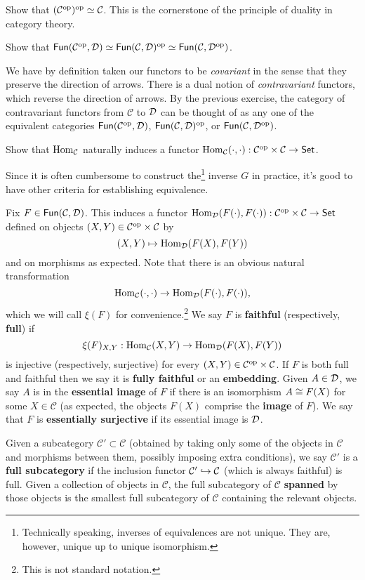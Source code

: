 \documentclass[11pt]{article}
\renewcommand{\C}{\mathcal{C}}
\begin{document}
\begin{exercise}
Show that $(\C^{\op})^{\op}\simeq\C$. This is the cornerstone of the principle of duality in category theory.
\end{exercise}

\begin{exercise}
Show that $\Fun(\C^{\op},\D)\simeq\Fun(\C,\D)^{\op}\simeq\Fun(\C,\D^{\op})$.
\end{exercise}

\begin{remark}
We have by definition taken our functors to be \emph{covariant} in the sense that they preserve the direction of arrows. There is a dual notion of \emph{contravariant} functors, which reverse the direction of arrows. By the previous exercise, the category of contravariant functors from $\C$ to $\mathcal{D}$ can be thought of as any one of the equivalent categories $\Fun(\C^{\op},\D)$, $\Fun(\C,\D)^{\op}$, or $\Fun(\C,\D^{\op})$.
\end{remark} 

\begin{exercise}
Show that $\Hom_{\C}$ naturally induces a functor $\Hom_{\C}(\cdot,\cdot): \C^{\op}\times\C\to\Set$.
\end{exercise}

Since it is often cumbersome to construct the\footnote{Technically speaking, inverses of equivalences are not unique. They are, however, unique up to unique isomorphism.} inverse $G$ in practice, it's good to have other criteria for establishing equivalence.

\begin{definition}
Fix $F\in\Fun(\C,\D)$. This induces a functor $\Hom_{\D}(F(\cdot),F(\cdot)): \C^{\op}\times\C\to\Set$ defined on objects $(X,Y)\in\C^{\op}\times\C$ by 
$$(X,Y)\mapsto\operatorname{Hom}_{\mathcal{D}}(F(X),F(Y))$$
and on morphisms as expected. Note that there is an obvious natural transformation
$$\Hom_{\C}(\cdot,\cdot)\to\Hom_{\D}(F(\cdot),F(\cdot)),$$
which we will call $\xi(F)$ for convenience.\footnote{This is not standard notation.} We say $F$ is \textbf{faithful} (respectively, \textbf{full}) if 
$$\xi(F)_{X,Y}: \Hom_{\C}(X,Y)\to\Hom_{\D}(F(X),F(Y))$$ 
is injective (respectively, surjective) for every $(X,Y)\in\C^{\op}\times\C$. If $F$ is both full and faithful then we say it is \textbf{fully faithful} or an \textbf{embedding}. Given $A\in\mathcal{D}$, we say $A$ is in the \textbf{essential image} of $F$ if there is an isomorphism $A\cong F(X)$ for some $X\in\C$ (as expected, the objects $F(X)$ comprise the \textbf{image} of $F$). We say that $F$ is \textbf{essentially surjective} if its essential image is $\mathcal{D}$.

Given a subcategory $\C'\subset\C$ (obtained by taking only some of the objects in $\C$ and morphisms between them, possibly imposing extra conditions), we say $\C'$ is a \textbf{full subcategory} if the inclusion functor $\C'\inj\C$ (which is always faithful) is full. Given a collection of objects in $\C$, the full subcategory of $\C$ \textbf{spanned} by those objects is the smallest full subcategory of $\C$ containing the relevant objects.
\end{definition}
\end{document}

